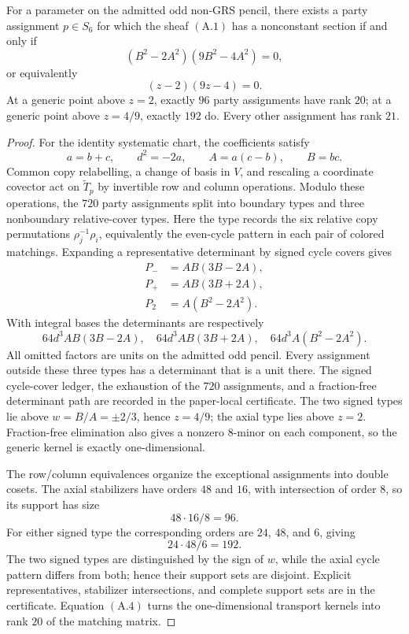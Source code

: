 \begin{theorem}\label{thm:transport-divisor}
For a parameter on the admitted odd non-GRS pencil, there exists a party
assignment \(p\in S_6\) for which the sheaf
\((\mathrm{A}.1)\) has a nonconstant
section if and only if
\[
 (B^2-2A^2)(9B^2-4A^2)=0,
\]
or equivalently
\[
 (z-2)(9z-4)=0.                                       \tag{A.5}
\]
At a generic point above \(z=2\), exactly \(96\) party assignments have
rank \(20\); at a generic point above \(z=4/9\), exactly \(192\) do.
Every other assignment has rank \(21\).
\end{theorem}

\begin{proof}
For the identity systematic chart, the coefficients satisfy
\[
 a=b+c,\qquad d^2=-2a,\qquad A=a(c-b),\qquad B=bc.
\]
Common copy relabelling, a change of basis in \(V\), and rescaling a
coordinate covector act on \(\widetilde T_p\) by invertible row and column
operations.  Modulo these operations, the \(720\) party assignments
split into boundary types and three nonboundary relative-cover types.
Here the type records the six relative copy permutations
\(\rho_j^{-1}\rho_i\), equivalently the even-cycle pattern in each pair
of colored matchings.  Expanding a representative determinant by signed
cycle covers gives
\[
\begin{split}
P_-&=AB(3B-2A),\\
P_+&=AB(3B+2A),\\
P_2&=A(B^2-2A^2).
\end{split}
\]
With integral bases the determinants are respectively
\[
64d^3AB(3B-2A),\quad
64d^3AB(3B+2A),\quad
64d^3A(B^2-2A^2).
\]
All omitted factors are units on the admitted odd pencil.  Every
assignment outside these three types has a determinant that is a unit
there.  The signed cycle-cover ledger, the exhaustion of the \(720\)
assignments, and a fraction-free determinant path are recorded in the
paper-local certificate.  The two signed types lie above
\(w=B/A=\pm2/3\), hence \(z=4/9\); the axial type lies above \(z=2\).
Fraction-free elimination also gives a nonzero \(8\)-minor on each
component, so the generic kernel is exactly one-dimensional.

The row/column equivalences organize the exceptional assignments into
double cosets.  The axial stabilizers have orders \(48\) and \(16\),
with intersection of order \(8\), so its support has size
\[
 48\cdot16/8=96.
\]
For either signed type the corresponding orders are \(24\), \(48\), and
\(6\), giving
\[
 24\cdot48/6=192.
\]
The two signed types are distinguished by the sign of \(w\), while the
axial cycle pattern differs from both; hence their support sets are
disjoint.  Explicit representatives, stabilizer intersections, and
complete support sets are in the certificate.
Equation \((\mathrm{A}.4)\) turns
the one-dimensional transport kernels into rank \(20\) of the matching
matrix.
\end{proof}

